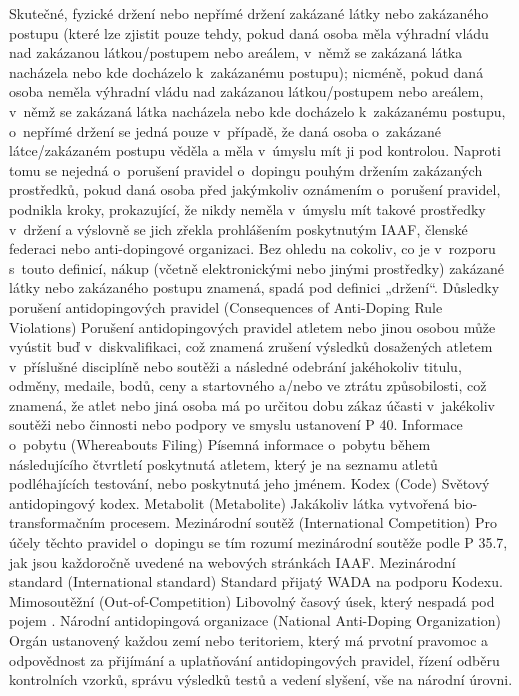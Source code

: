 \dd Skutečné, fyzické držení nebo nepřímé držení zakázané látky nebo zakázaného postupu (které lze zjistit pouze tehdy, pokud daná osoba měla výhradní vládu nad zakázanou látkou/postupem nebo areálem, v~němž se zakázaná látka nacházela nebo kde docházelo k~zakázanému postupu);  nicméně, pokud daná osoba neměla výhradní vládu nad zakázanou látkou/postupem nebo areálem, v~němž se zakázaná látka nacházela nebo kde docházelo k~zakázanému postupu, o~nepřímé držení se jedná pouze v~případě, že daná osoba o~zakázané látce/zakázaném postupu věděla a měla v~úmyslu mít ji pod kontrolou. Naproti tomu se nejedná o~porušení pravidel o~dopingu pouhým držením zakázaných prostředků, pokud daná osoba před jakýmkoliv oznámením o~porušení pravidel, podnikla kroky, prokazující, že nikdy neměla v~úmyslu mít takové prostředky v~držení a výslovně se jich zřekla prohlášením poskytnutým IAAF, členské federaci nebo anti-dopingové organizaci. Bez ohledu na cokoliv, co je v~rozporu s~touto definicí, nákup (včetně elektronickými nebo jinými prostředky) zakázané látky nebo zakázaného postupu znamená, spadá pod definici „držení“.
\dend
\dt Důsledky porušení antidopingových pravidel (Consequences of Anti-Doping Rule Violations)
\dd Porušení antidopingových pravidel atletem nebo jinou osobou může vyústit buď v~diskvalifikaci, což znamená zrušení výsledků dosažených atletem v~příslušné disciplíně nebo soutěži a následné odebrání jakéhokoliv titulu, odměny, medaile, bodů, ceny a startovného a/nebo ve ztrátu způsobilosti, což znamená, že atlet nebo jiná osoba má po určitou dobu zákaz účasti v~jakékoliv soutěži nebo činnosti nebo podpory ve smyslu ustanovení P 40.
\dend
\dt Informace o~pobytu (Whereabouts Filing)
\dd Písemná informace o~pobytu během následujícího čtvrtletí poskytnutá atletem, který je na seznamu atletů podléhajících testování, nebo poskytnutá jeho jménem.
\dend
\dt Kodex (Code)
\dd Světový antidopingový kodex.
\dend
\dt Metabolit (Metabolite)
\dd Jakákoliv látka vytvořená bio-transformačním procesem.
\dend
\dt Mezinárodní soutěž (International Competition)
\dd Pro účely těchto pravidel o~dopingu se tím rozumí mezinárodní soutěže podle P 35.7, jak jsou každoročně uvedené na webových stránkách IAAF.
\dend
\dt Mezinárodní standard  (International standard)
\dd Standard přijatý WADA na podporu Kodexu.
\dend
\dt Mimosoutěžní (Out-of-Competition)
\dd Libovolný časový úsek, který nespadá pod pojem .
\dend
\dt Národní antidopingová organizace (National Anti-Doping Organization)
\dd Orgán ustanovený každou zemí nebo teritoriem, který má prvotní pravomoc a odpovědnost za přijímání a uplatňování antidopingových pravidel, řízení odběru kontrolních vzorků, správu výsledků testů a vedení slyšení, vše na národní úrovni.
